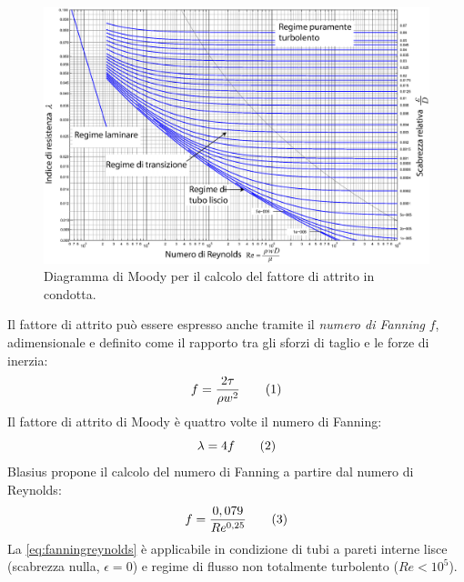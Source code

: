 \begin{figure}[htbp] %
    \centering
    \includegraphics[width=.9\textwidth]{fig/fluidodinamica/moody.eps}
    \caption{Diagramma di Moody per il calcolo del fattore di attrito in condotta.} 
    \label{fig:moody}
\end{figure}

Il fattore di attrito può essere espresso anche tramite il \textit{numero di Fanning} \(f\), adimensionale e definito come il rapporto tra gli sforzi di taglio e le forze di inerzia:
\[f=\dfrac{2\tau}{\rho w^2} \addtag \label{fanning} \]
Il fattore di attrito di Moody è quattro volte il numero di Fanning:
\[\lambda = 4f \addtag \label{eq:fanningmoody} \]
Blasius propone il calcolo del numero di Fanning a partire dal numero di Reynolds:
\[f=\dfrac{0,079}{Re^{0,25}} \addtag \label{eq:fanningreynolds} \]
La \eqref{eq:fanningreynolds} è applicabile in condizione di tubi a pareti interne lisce (scabrezza nulla, \(\epsilon=0\)) e regime di flusso non totalmente turbolento (\(Re<10^5\)).
